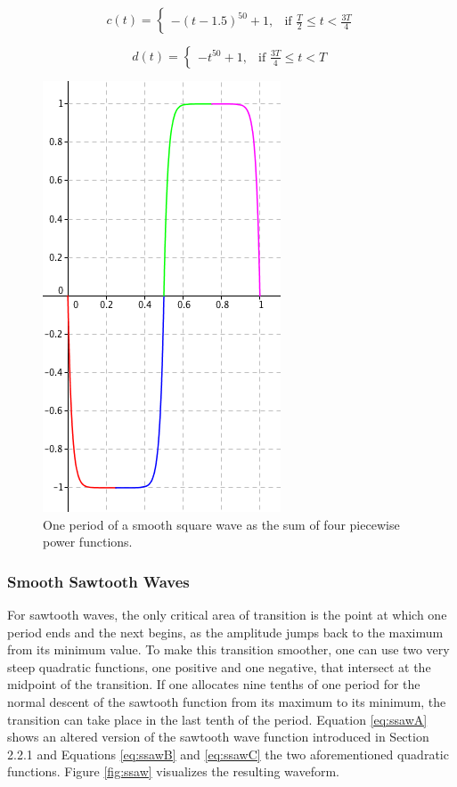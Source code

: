   \begin{equation}
    c(t) =
    \begin{cases}
      -(t - 1.5)^{50} + 1,& \text{if } \frac{T}{2} \leq t < \frac{3T}{4}
    \end{cases}
    \label{eq:ssquareC}
  \end{equation}

  \begin{equation}
    d(t) =
    \begin{cases}
      -t^{50} + 1,& \text{if } \frac{3T}{4} \leq t < T
    \end{cases}
    \label{eq:ssquareD}
  \end{equation}

  \begin{figure}[t!]
    \includegraphics[scale=0.5]{img/ssquare}
    \caption{One period of a smooth square wave as the sum of four piecewise power functions.}
    \label{fig:ssquare}
  \end{figure}

  \subsubsection{Smooth Sawtooth Waves}

  For sawtooth waves, the only critical area of transition is the point at which one period ends and the next begins, as the amplitude jumps back to the maximum from its minimum value. To make this transition smoother, one can use two very steep quadratic functions, one positive and one negative, that intersect at the midpoint of the transition. If one allocates nine tenths of one period for the normal descent of the sawtooth function from its maximum to its minimum, the transition can take place in the last tenth of the period. Equation \ref{eq:ssawA} shows an altered version of the sawtooth wave function introduced in Section 2.2.1 and Equations \ref{eq:ssawB} and \ref{eq:ssawC} the two aforementioned quadratic functions. Figure \ref{fig:ssaw} visualizes the resulting waveform.

